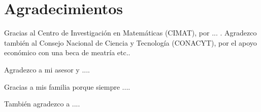

\chapter*{Agradecimientos} 
\label{Agradecimientos}


Gracias al Centro de Investigación en Matemáticas (CIMAT), por ... . Agradezco también al Consejo Nacional de Ciencia y Tecnología (CONACYT), por el apoyo económico con una beca de meatría etc..\bigskip 

Agradezco a mi asesor y ....\bigskip

Gracias a mis familia porque siempre ....\bigskip

También agradezco a ....


